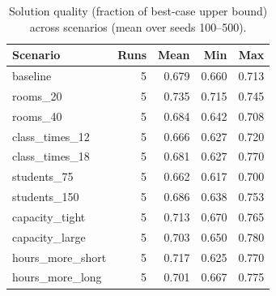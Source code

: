 \begin{table}[t]
\centering
\caption{Solution quality (fraction of best-case upper bound) across scenarios (mean over seeds 100--500).}
\label{tab:quality-scenarios}
\begin{tabular}{lrrrr}
\toprule
Scenario & Runs & Mean & Min & Max \\
\midrule
baseline & 5 & 0.679 & 0.660 & 0.713 \\
rooms\_20 & 5 & 0.735 & 0.715 & 0.745 \\
rooms\_40 & 5 & 0.684 & 0.642 & 0.708 \\
class\_times\_12 & 5 & 0.666 & 0.627 & 0.720 \\
class\_times\_18 & 5 & 0.681 & 0.627 & 0.770 \\
students\_75 & 5 & 0.662 & 0.617 & 0.700 \\
students\_150 & 5 & 0.686 & 0.638 & 0.753 \\
capacity\_tight & 5 & 0.713 & 0.670 & 0.765 \\
capacity\_large & 5 & 0.703 & 0.650 & 0.780 \\
hours\_more\_short & 5 & 0.717 & 0.625 & 0.770 \\
hours\_more\_long & 5 & 0.701 & 0.667 & 0.775 \\
\bottomrule
\end{tabular}
\end{table}
